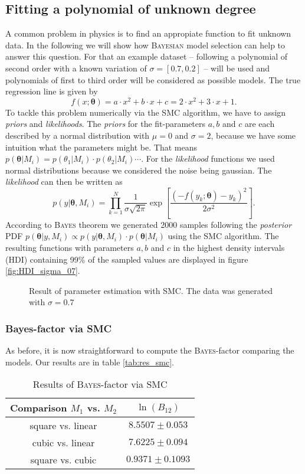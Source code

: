 \documentclass[%
 reprint,
 amsmath,amssymb,
 aps,
]{revtex4-1}
\newcommand{\btheta}{\boldsymbol{\theta}}
\begin{document}
\subsection{Fitting a polynomial of unknown degree}
\noindent A common problem in physics is to find an appropiate function to fit unknown data. In the following we will show how \textsc{Bayesian} model selection can help to answer this question. For that an example dataset -- following a polynomial of second order with a known variation of $\sigma=[0.7, 0.2]$ -- will be used and polynomials of first to third order will be considered as possible models. 
The true regression line is given by
\begin{equation*}
	f(x;\btheta)=a\cdot x^2+b\cdot x+c=2\cdot x^2+3\cdot x+1.
\end{equation*}
To tackle this problem numerically via the SMC algorithm, we have to assign \emph{priors} and \emph{likelihoods}. The \emph{priors} for the fit-parameters $a,b$ and $c$  are each described by a normal distribution with $\mu=0$ and $\sigma=2$, because we have some intuition what the parameters might be. That means $p(\btheta|M_i)=p(\theta_1|M_i)\cdot p(\theta_2|M_i)\cdots $. For the \emph{likelihood} functions we used normal distributions because we considered the noise being gaussian. The \emph{likelihood} can then be written as \cite[Chap. 3]{sivia}
$$p(y|\btheta, M_i)=\prod_{k=1}^{N}\frac{1}{\sigma\sqrt{2\pi}}\exp{\left[\frac{(-f(y_k;\btheta)-y_k)^2}{2\sigma^2}\right]}.$$
According to \textsc{Bayes} theorem we generated 2000 samples following the \emph{posterior} PDF $p(\btheta|y,M_i)\propto p(y|\btheta, M_i)\cdot p(\btheta|M_i) $ using the SMC algorithm. The resulting functions with parameters $a,b$ and $c$ in the highest density intervals (HDI) containing 99\% of the sampled values are displayed in figure \eqref{fig:HDI_sigma_07}.
\begin{figure*}
	\caption{Result of parameter estimation with SMC. The data was generated with $\sigma=0.7$}\label{fig:HDI_sigma_07}
\end{figure*}


\subsubsection{\textbf{Bayes-factor via SMC}}
As before, it is now straightforward to compute the \textsc{Bayes}-factor comparing the models. Our results are in table \eqref{tab:res_smc}.

\begin{table}[htbp]
	{\renewcommand{\arraystretch}{1.3}
		\begin{tabular}{|c|c|}
			\hline
			Comparison $M_1$ vs. $M_2$ & $\ln(B_{12})$  \\
			\hline
			square vs. linear& $8.5507\pm0.053$\\
			cubic vs. linear & $7.6225\pm0.094$\\
			square vs. cubic&$0.9371\pm0.1093$  \\
			\hline
	\end{tabular}}
	\caption{Results of \textsc{Bayes}-factor via SMC}
	\label{tab:res_smc}
\end{table}
\end{document}
